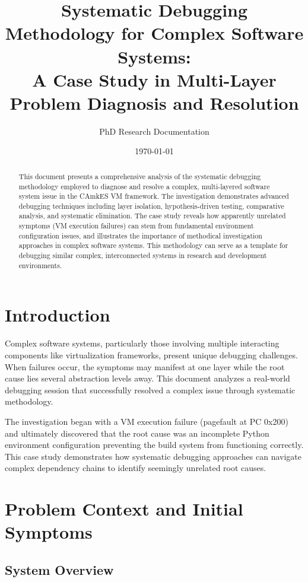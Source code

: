 \documentclass[11pt,a4paper]{article}
\title{Systematic Debugging Methodology for Complex Software Systems: \\
A Case Study in Multi-Layer Problem Diagnosis and Resolution}
\author{PhD Research Documentation}
\date{\today}
\begin{document}
\maketitle

\begin{abstract}
This document presents a comprehensive analysis of the systematic debugging methodology employed to diagnose and resolve a complex, multi-layered software system issue in the CAmkES VM framework. The investigation demonstrates advanced debugging techniques including layer isolation, hypothesis-driven testing, comparative analysis, and systematic elimination. The case study reveals how apparently unrelated symptoms (VM execution failures) can stem from fundamental environment configuration issues, and illustrates the importance of methodical investigation approaches in complex software systems. This methodology can serve as a template for debugging similar complex, interconnected systems in research and development environments.
\end{abstract}

\tableofcontents
\newpage

\section{Introduction}

Complex software systems, particularly those involving multiple interacting components like virtualization frameworks, present unique debugging challenges. When failures occur, the symptoms may manifest at one layer while the root cause lies several abstraction levels away. This document analyzes a real-world debugging session that successfully resolved a complex issue through systematic methodology.

The investigation began with a VM execution failure (pagefault at PC 0x200) and ultimately discovered that the root cause was an incomplete Python environment configuration preventing the build system from functioning correctly. This case study demonstrates how systematic debugging approaches can navigate complex dependency chains to identify seemingly unrelated root causes.

\section{Problem Context and Initial Symptoms}

\subsection{System Overview}
\end{document}
